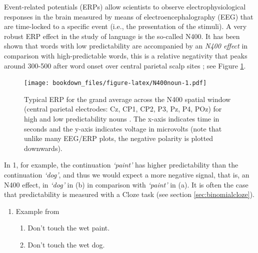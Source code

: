 \documentclass[12pt,]{krantz}
\providecommand{\tightlist}{%
  \setlength{\itemsep}{0pt}\setlength{\parskip}{0pt}}
\theoremstyle{definition}
\theoremstyle{definition}
\theoremstyle{definition}
\theoremstyle{remark}
\begin{document}
Event-related potentials (ERPs) allow scientists to observe
electrophysiological responses in the brain measured by means of
electroencephalography (EEG) that are time-locked to a specific event
(i.e., the presentation of the stimuli). A very robust ERP effect in the
study of language is the so-called N400. It has been shown that words
with low predictability are accompanied by an \emph{N400 effect} in
comparison with high-predictable words, this is a relative negativity
that peaks around 300-500 after word onset over central parietal scalp
sites \citetext{\citealp[first noticed
in][]{kutasReadingSenselessSentences1980}; \citealp[for semantic
anomalies and in][ for low predictable
word]{kutasBrainPotentialsReading1984}; \citealp[for a
review:][]{kutasThirtyYearsCounting2011}}; see Figure
\ref{fig:N400noun}.









\begin{figure}
\centering
\texttt{[image: bookdown\_files/figure-latex/N400noun-1.pdf]}
\caption{\label{fig:N400noun}Typical ERP for the grand average across the N400 spatial
window (central parietal electrodes: Cz, CP1, CP2, P3, Pz, P4, POz) for
high and low predictability nouns \citep[specifically from the
constraining context of the experiment reported
in][]{nicenboim_vasishth_rosler_2020}. The x-axis indicates time in
seconds and the y-axis indicates voltage in microvolts (note that unlike
many EEG/ERP plots, the negative polarity is plotted downwards).}
\end{figure}

In 1, for example, the continuation \emph{`paint'} has higher
predictability than the continuation \emph{`dog'}, and thus we would
expect a more negative signal, that is, an N400 effect, in \emph{`dog'}
in (b) in comparison with \emph{`paint'} in (a). It is often the case
that predictability is measured with a Cloze task (see section
\ref{sec:binomialcloze}).

\begin{enumerate}
\def\labelenumi{\arabic{enumi}.}
\tightlist
\item
  Example from \citet{kutasBrainPotentialsReading1984}

  \begin{enumerate}
  \def\labelenumii{\alph{enumii}.}
  \tightlist
  \item
    Don't touch the wet paint.
  \item
    Don't touch the wet dog.
  \end{enumerate}
\end{enumerate}
\end{document}
